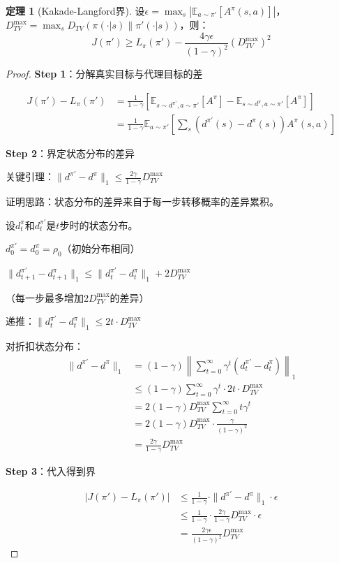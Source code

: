\documentclass[11pt,a4paper]{article}
\theoremstyle{definition}
\newtheorem{theorem}{定理}[section]
\begin{document}
\begin{theorem}[Kakade-Langford界]
设$\epsilon = \max_s |\mathbb{E}_{a \sim \pi'}[A^\pi(s,a)]|$，$D_{TV}^{\max} = \max_s D_{TV}(\pi(\cdot|s) \| \pi'(\cdot|s))$，则：
\[
J(\pi') \geq L_\pi(\pi') - \frac{4\gamma\epsilon}{(1-\gamma)^2} (D_{TV}^{\max})^2
\]
\end{theorem}

\begin{proof}
\textbf{Step 1}：分解真实目标与代理目标的差

\begin{align*}
J(\pi') - L_\pi(\pi') &= \frac{1}{1-\gamma}\left[\mathbb{E}_{s \sim d^{\pi'}, a \sim \pi'}[A^\pi] - \mathbb{E}_{s \sim d^\pi, a \sim \pi'}[A^\pi]\right] \\
&= \frac{1}{1-\gamma}\mathbb{E}_{a \sim \pi'}\left[\sum_s (d^{\pi'}(s) - d^\pi(s)) A^\pi(s,a)\right]
\end{align*}

\textbf{Step 2}：界定状态分布的差异

关键引理：$\|d^{\pi'} - d^\pi\|_1 \leq \frac{2\gamma}{1-\gamma} D_{TV}^{\max}$

证明思路：状态分布的差异来自于每一步转移概率的差异累积。

设$d_t^\pi$和$d_t^{\pi'}$是$t$步时的状态分布。

$d_0^{\pi'} = d_0^\pi = \rho_0$（初始分布相同）

$\|d_{t+1}^{\pi'} - d_{t+1}^\pi\|_1 \leq \|d_t^{\pi'} - d_t^\pi\|_1 + 2D_{TV}^{\max}$

（每一步最多增加$2D_{TV}^{\max}$的差异）

递推：$\|d_t^{\pi'} - d_t^\pi\|_1 \leq 2t \cdot D_{TV}^{\max}$

对折扣状态分布：
\begin{align*}
\|d^{\pi'} - d^\pi\|_1 &= (1-\gamma)\left\|\sum_{t=0}^\infty \gamma^t (d_t^{\pi'} - d_t^\pi)\right\|_1 \\
&\leq (1-\gamma) \sum_{t=0}^\infty \gamma^t \cdot 2t \cdot D_{TV}^{\max} \\
&= 2(1-\gamma) D_{TV}^{\max} \sum_{t=0}^\infty t\gamma^t \\
&= 2(1-\gamma) D_{TV}^{\max} \cdot \frac{\gamma}{(1-\gamma)^2} \\
&= \frac{2\gamma}{1-\gamma} D_{TV}^{\max}
\end{align*}

\textbf{Step 3}：代入得到界

\begin{align*}
|J(\pi') - L_\pi(\pi')| &\leq \frac{1}{1-\gamma} \cdot \|d^{\pi'} - d^\pi\|_1 \cdot \epsilon \\
&\leq \frac{1}{1-\gamma} \cdot \frac{2\gamma}{1-\gamma} D_{TV}^{\max} \cdot \epsilon \\
&= \frac{2\gamma\epsilon}{(1-\gamma)^2} D_{TV}^{\max}
\end{align*}


\end{proof}
\end{document}
